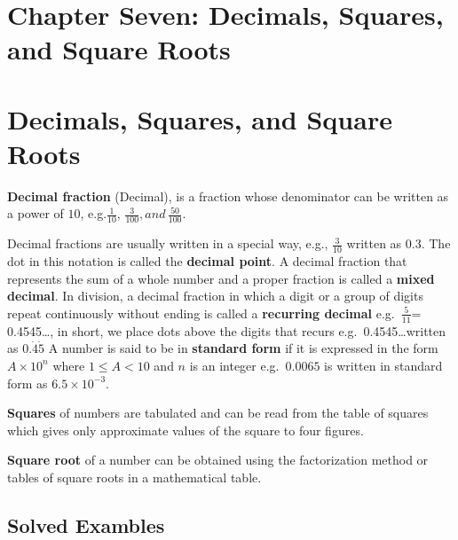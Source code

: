 \documentclass[
  a4paperpaper,
]{scrbook}
\begin{document}
\hypertarget{chapter-seven-decimals-squares-and-square-roots}{%
\chapter{Chapter Seven: Decimals, Squares, and Square
Roots}\label{chapter-seven-decimals-squares-and-square-roots}}


\hypertarget{decimals-squares-and-square-roots}{%
\chapter*{Decimals, Squares, and Square
Roots}\label{decimals-squares-and-square-roots}}


\textbf{Decimal fraction} (Decimal), is a fraction whose denominator can
be written as a power of \(10\),
e.g.\(\frac{1}{10},\,\frac{3}{100}, and\,\frac{50}{100}\).

Decimal fractions are usually written in a special way, e.g.,
\(\frac{3}{10}\) written as \(0.3\). The dot in this notation is called
the \textbf{decimal point}. A decimal fraction that represents the sum
of a whole number and a proper fraction is called a \textbf{mixed
decimal}. In division, a decimal fraction in which a digit or a group of
digits repeat continuously without ending is called a \textbf{recurring
decimal} e.g.~\(\frac{5}{11}\)= 0.4545\ldots, in short, we place dots
above the digits that recurs e.g.~0.4545\ldots written as
\(0.\dot{4}\dot{5}\) A number is said to be in \textbf{standard form} if
it is expressed in the form \(A\times 10^n\) where \(1\leq A<10\) and
\(n\) is an integer e.g.~\(0.0065\) is written in standard form as
\(6.5\times 10^{-3}\).

\textbf{Squares} of numbers are tabulated and can be read from the table
of squares which gives only approximate values of the square to four
figures.

\textbf{Square root} of a number can be obtained using the factorization
method or tables of square roots in a mathematical table.

\hypertarget{solved-exambles}{%
\section{Solved Exambles}\label{solved-exambles}}
\end{document}
